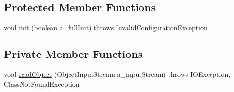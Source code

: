 \subsection*{Protected Member Functions}
\begin{DoxyCompactItemize}
\item 
void \hyperlink{classorg_1_1jgap_1_1gp_1_1impl_1_1_g_p_configuration_a97498de731029f37e23ac9ff7bab3de2}{init} (boolean a\-\_\-full\-Init)  throws Invalid\-Configuration\-Exception 
\end{DoxyCompactItemize}
\subsection*{Private Member Functions}
\begin{DoxyCompactItemize}
\item 
void \hyperlink{classorg_1_1jgap_1_1gp_1_1impl_1_1_g_p_configuration_a597194586495879a94da6d1e4205de02}{read\-Object} (Object\-Input\-Stream a\-\_\-input\-Stream)  throws I\-O\-Exception, Class\-Not\-Found\-Exception 
\end{DoxyCompactItemize}
